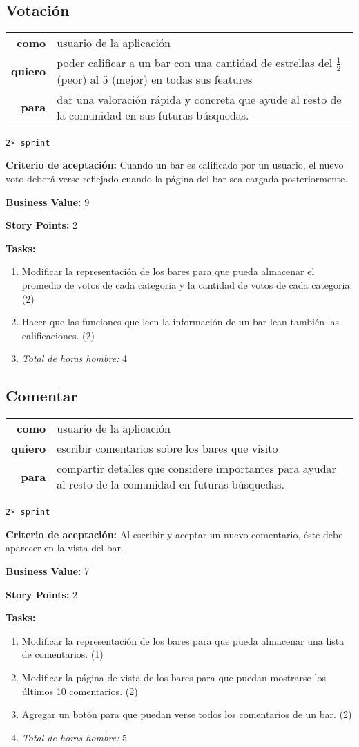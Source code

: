 \documentclass[hidelinks,a4paper,11pt, nofootinbib]{article}
\newcommand{\userstory}[3]{
\begin{tabular}{|r p{10cm}|}
  \hline
  \textbf{como} & #1 \\
  \textbf{quiero} & #2 \\
  \textbf{para} & #3 \\
  \hline
\end{tabular}

}
\newcommand{\critdeacep}[1]{\textbf{Criterio de aceptación:} #1

}
\newcommand{\busvalue}[1]{\textbf{Business Value:} #1

}
\newcommand{\storypoints}[1]{\textbf{Story Points:} #1

}
\newcommand{\segundosprint}{\texttt{2º sprint}

}
\newcommand{\tasks}[1]{\textbf{Tasks:} 

#1}
\begin{document}
\subsection*{Votación}
\userstory{usuario de la aplicación}{poder calificar a un bar con una cantidad de estrellas del $\frac{1}{2}$ (peor) al $5$ (mejor) en todas sus features}{dar una valoración rápida y concreta que ayude al resto de la comunidad en sus futuras búsquedas.}
\segundosprint
\critdeacep{Cuando un bar es calificado por un usuario, el nuevo voto deberá verse reflejado cuando la página del bar sea cargada posteriormente.}
\busvalue{9}
\storypoints{2}
\tasks{
  \begin{enumerate}
    \item Modificar la representación de los bares para que pueda almacenar el promedio de votos de cada categoria y la cantidad de votos de cada categoria. (2)
    \item Hacer que las funciones que leen la información de un bar lean también las calificaciones. (2)
    \item[] \textit{Total de horas hombre:} 4
  \end{enumerate}
}

\subsection*{Comentar}
\userstory{usuario de la aplicación}{escribir comentarios sobre los bares que visito}{compartir detalles que considere importantes para ayudar al resto de la comunidad en futuras búsquedas.}
\segundosprint
\critdeacep{Al escribir y aceptar un nuevo comentario, éste debe aparecer en la vista del bar.}
\busvalue{7}
\storypoints{2}
\tasks{
  \begin{enumerate}
    \item Modificar la representación de los bares para que pueda almacenar una lista de comentarios. (1)
    \item Modificar la página de vista de los bares para que puedan mostrarse los últimos 10 comentarios. (2)
    \item Agregar un botón para que puedan verse todos los comentarios de un bar. (2)
    \item[] \textit{Total de horas hombre:} 5
  \end{enumerate}
}
\end{document}

